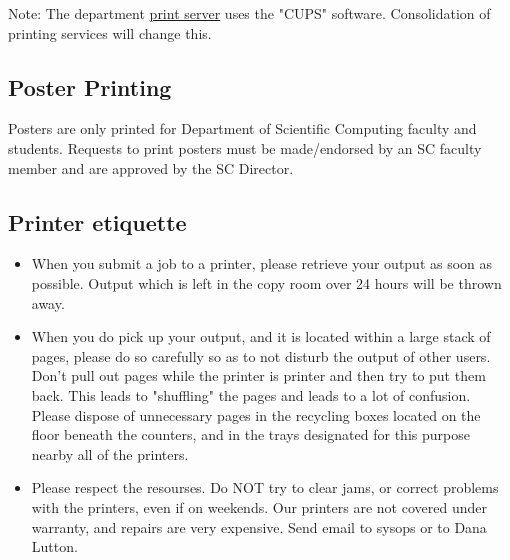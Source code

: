 \documentclass[12pt,a4paper]{article}
\begin{document}
Note: The department \href{http://printers.sc.fsu.edu/printers/}{print server} uses the "CUPS" software. Consolidation of printing services will change this.

\subsection*{Poster Printing}
Posters are only printed for Department of Scientific Computing faculty and students.
Requests to print posters must be made/endorsed by an SC faculty member and are approved by the SC Director.

\subsection*{Printer etiquette}
\begin{itemize}
    \item When you submit a job to a printer, please retrieve your output as soon as possible. Output which is left in the copy room over 24 hours will be thrown away.
    \item When you do pick up your output, and it is located within a large stack of pages, please do so carefully so as to not disturb the output of other users. Don't pull out pages while the printer is printer and then try to put them back. This leads to "shuffling" the pages and leads to a lot of confusion. Please dispose of unnecessary pages in the recycling boxes located on the floor beneath the counters, and in the trays designated for this purpose nearby all of the printers.
    \item Please respect the resourses. Do NOT try to clear jams, or correct problems with the printers, even if on weekends. Our printers are not covered under warranty, and repairs are very expensive. Send email to sysops or to Dana Lutton.
\end{itemize}
\end{document}
